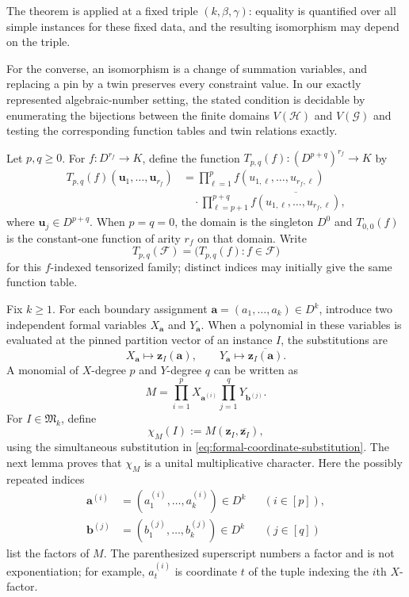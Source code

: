 \documentclass[11pt]{article}
\theoremstyle{plain}
\theoremstyle{definition}
\theoremstyle{remark}
\newcommand{\cF}{\mathcal F}
\newcommand{\zvec}[1]{\mathbf z_{#1}}
\newcommand{\InstMonoid}[1]{\mathfrak M_{#1}}
\begin{document}
The theorem is applied at a fixed triple $(k,\beta,\gamma)$: equality is
quantified over all simple instances for these fixed data, and the resulting
isomorphism may depend on the triple.

For the converse, an isomorphism is a change of summation variables, and
replacing a pin by a twin preserves every constraint value.  In our exactly
represented algebraic-number setting, the stated condition is decidable by
enumerating the bijections between the finite domains $V(\mathcal H)$ and
$V(\mathcal G)$ and testing the corresponding function tables and twin
relations exactly.

Let $p,q\ge0$.  For $f:D^{r_f}\to K$, define the function
$T_{p,q}(f):(D^{p+q})^{r_f}\to K$ by
\begin{align*}
  T_{p,q}(f)(\mathbf u_1,\ldots,\mathbf u_{r_f})
  &={}
    \prod_{\ell=1}^{p}
      f(u_{1,\ell},\ldots,u_{r_f,\ell})\\
  &\quad\cdot
    \prod_{\ell=p+1}^{p+q}
      \overline{f(u_{1,\ell},\ldots,u_{r_f,\ell})},
\end{align*}
where $\mathbf u_j\in D^{p+q}$.  When $p=q=0$, the domain is the
singleton $D^0$ and $T_{0,0}(f)$ is the constant-one function of arity
$r_f$ on that domain.  Write
\[
  T_{p,q}(\cF)=\bigl(T_{p,q}(f):f\in\cF\bigr)
\]
for this $f$-indexed tensorized family; distinct indices may initially give
the same function table.

Fix $k\ge1$.  For each boundary assignment
$\mathbf a=(a_1,\ldots,a_k)\in D^k$, introduce two independent formal
variables $X_{\mathbf a}$ and $Y_{\mathbf a}$.  When a polynomial in these
variables is evaluated at the pinned partition vector of an instance $I$,
the substitutions are
\begin{equation}
  X_{\mathbf a}\longmapsto\zvec I(\mathbf a),
  \qquad
  Y_{\mathbf a}\longmapsto\overline{\zvec I(\mathbf a)}.
  \label{eq:formal-coordinate-substitution}
\end{equation}
A monomial of $X$-degree $p$ and $Y$-degree $q$ can be written as
\begin{equation*}
  M=\prod_{i=1}^{p}X_{\mathbf a^{(i)}}
    \prod_{j=1}^{q}Y_{\mathbf b^{(j)}}.
\end{equation*}
For $I\in\InstMonoid{k}$, define
\begin{equation*}
  \chi_M(I):=M(\zvec I,\overline{\zvec I}),
\end{equation*}
using the simultaneous substitution in
\eqref{eq:formal-coordinate-substitution}.  The next lemma proves that
$\chi_M$ is a unital multiplicative character.
Here the possibly repeated indices
\[
\begin{aligned}
  \mathbf a^{(i)}&=(a_1^{(i)},\ldots,a_k^{(i)})\in D^k
    &&(i\in[p]),\\
  \mathbf b^{(j)}&=(b_1^{(j)},\ldots,b_k^{(j)})\in D^k
    &&(j\in[q])
\end{aligned}
\]
list the factors of $M$.  The parenthesized superscript numbers a factor and
is not exponentiation; for example, $a_t^{(i)}$ is coordinate $t$ of the
tuple indexing the $i$th $X$-factor.
\end{document}
